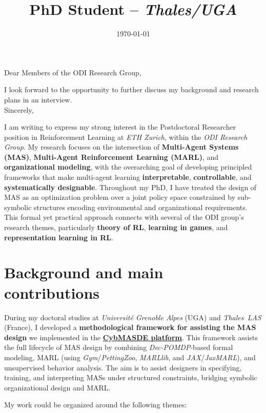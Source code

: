 \documentclass[11pt,a4paper,sans]{moderncv}
\title{PhD Student -- \textit{Thales/UGA}}
\begin{document}
\date{\today}
\opening{Dear Members of the ODI Research Group,}
\closing{{I look forward to the opportunity to further discuss my background and research plans in an interview.}\\[0.6cm]Sincerely,\vspace{-0.6cm}}

\makelettertitle

\justifying

\noindent

\noindent
I am writing to express my strong interest in the Postdoctoral Researcher position in Reinforcement Learning at \textit{ETH Zurich}, within the \textit{ODI Research Group}.
My research focuses on the intersection of \textbf{Multi-Agent Systems (MAS)}, \textbf{Multi-Agent Reinforcement Learning (MARL)}, and \textbf{organizational modeling}, with the overarching goal of developing principled frameworks that make multi-agent learning \textbf{interpretable}, \textbf{controllable}, and \textbf{systematically designable}.
Throughout my PhD, I have treated the design of MAS as an optimization problem over a joint policy space constrained by sub-symbolic structures encoding environmental and organizational requirements.
This formal yet practical approach connects with several of the ODI group's research themes, particularly \textbf{theory of RL}, \textbf{learning in games}, and \textbf{representation learning in RL}.

\section*{Background and main contributions}

During my doctoral studies at \textit{Université Grenoble Alpes} (UGA) and \textit{Thales~LAS} (France), I developed a \textbf{methodological framework for assisting the MAS design} we implemented in the \href{https://github.com/julien6/CybMASDE}{\textbf{CybMASDE platform}}.
This framework assists the full lifecycle of MAS design by combining \textit{Dec-POMDP}-based formal modeling, MARL (using \textit{Gym}/\textit{PettingZoo}, \textit{MARLlib}, and \textit{JAX}/\textit{JaxMARL}), and unsupervised behavior analysis.
The aim is to assist designers in specifying, training, and interpreting MASs under structured constraints, bridging symbolic organizational design and MARL.

My work could be organized around the following themes:
\end{document}
